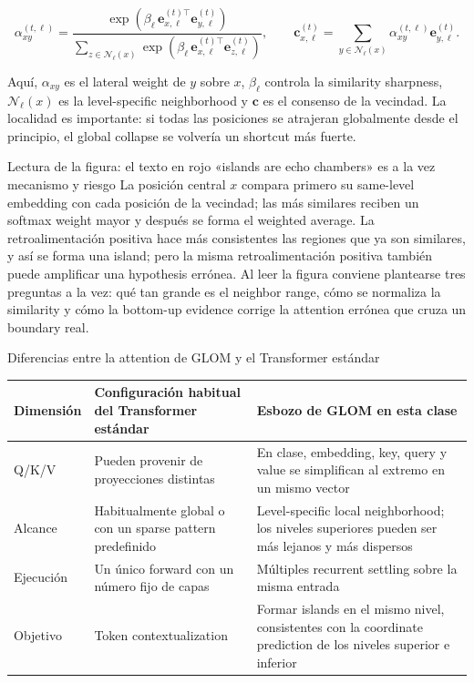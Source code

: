 \[
\alpha_{xy}^{(t,\ell)}=
\frac{\exp\!\left(\beta_\ell\,\mathbf e_{x,\ell}^{(t)\top}\mathbf e_{y,\ell}^{(t)}\right)}
{\sum_{z\in\mathcal N_\ell(x)}\exp\!\left(\beta_\ell\,\mathbf e_{x,\ell}^{(t)\top}\mathbf e_{z,\ell}^{(t)}\right)},
\qquad
\mathbf c_{x,\ell}^{(t)}=\sum_{y\in\mathcal N_\ell(x)}\alpha_{xy}^{(t,\ell)}\mathbf e_{y,\ell}^{(t)}.
\]

Aquí, $\alpha_{xy}$ es el lateral weight de $y$ sobre $x$, $\beta_\ell$ controla la similarity sharpness, $\mathcal N_\ell(x)$ es la level-specific neighborhood y $\mathbf c$ es el consenso de la vecindad. La localidad es importante: si todas las posiciones se atrajeran globalmente desde el principio, el global collapse se volvería un shortcut más fuerte.


\begin{knowledgebox}{Lectura de la figura: el texto en rojo «islands are echo chambers» es a la vez mecanismo y riesgo}
La posición central $x$ compara primero su same-level embedding con cada posición de la vecindad; las más similares reciben un softmax weight mayor y después se forma el weighted average. La retroalimentación positiva hace más consistentes las regiones que ya son similares, y así se forma una island; pero la misma retroalimentación positiva también puede amplificar una hypothesis errónea. Al leer la figura conviene plantearse tres preguntas a la vez: qué tan grande es el neighbor range, cómo se normaliza la similarity y cómo la bottom-up evidence corrige la attention errónea que cruza un boundary real.
\end{knowledgebox}

\begin{knowledgebox}{Diferencias entre la attention de GLOM y el Transformer estándar}
\begin{tabularx}{\textwidth}{L{0.24\textwidth}L{0.33\textwidth}>{\raggedright\arraybackslash}X}
\toprule
Dimensión & Configuración habitual del Transformer estándar & Esbozo de GLOM en esta clase \\
\midrule
Q/K/V & Pueden provenir de proyecciones distintas & En clase, embedding, key, query y value se simplifican al extremo en un mismo vector \\
Alcance & Habitualmente global o con un sparse pattern predefinido & Level-specific local neighborhood; los niveles superiores pueden ser más lejanos y más dispersos \\
Ejecución & Un único forward con un número fijo de capas & Múltiples recurrent settling sobre la misma entrada \\
Objetivo & Token contextualization & Formar islands en el mismo nivel, consistentes con la coordinate prediction de los niveles superior e inferior \\
\bottomrule
\end{tabularx}
\end{knowledgebox}

